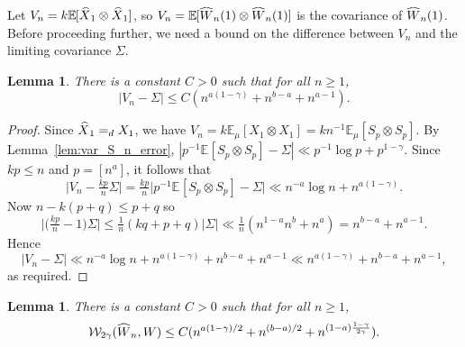 \documentclass[11pt,a4paper,reqno,oneside]{amsart}
\newcommand{\eqd}{=_d}
\newcommand{\Ex}[2][]{\mathbb{E}_{#1\!\!}\left[#2\right]}
\newcommand{\wass}{\mathcal{W}}
\newcommand{\shat}[1]{\vphantom{#1}\smash[t]{\widehat{#1}}}
\newtheorem{lemma}[theorem]{Lemma}
\theoremstyle{definition}
\theoremstyle{remark}
\numberwithin{equation}{section}
\begin{document}
	Let $ V_n = k\Ex{\shat X_1 \otimes \shat X_1} $, so $ V_n = \Ex{\shat W_n(1)\otimes \shat W_n(1)} $ is the covariance of $ \shat W_n(1) $. Before proceeding further, we need a bound on the difference between $ V_n $ and the limiting covariance $ \Sigma $.
	\begin{lemma}\label{lemma:indep_approx_covar_error}
		There is a constant $ C>0 $ such that for all $ n\ge 1 $, \[ |V_n - \Sigma|\le C(n^{a(1-\gamma)}+n^{b-a}+n^{a-1}). \]
	\end{lemma}
	\begin{proof}
		Since $\shat X_1\eqd X_1 $, we have
		$V_n = k\Ex[\mu]{ X_1 \otimes X_1}=kn^{-1}\Ex[\mu]{S_p\otimes S_p}.$ By Lemma~\ref{lem:var_S_n_error},
		$ |p^{-1}\Ex{S_p\otimes S_p} - \Sigma|\ll p^{-1}\log p+p^{1-\gamma}. $
		Since $ kp\le n $ and $ p=[n^a]$, it follows that
		\begin{equation*}
			\big|V_n - \tfrac{kp}{n}\Sigma\big|=\tfrac{kp}{n}\big|p^{-1}\Ex{S_p\otimes S_p} - \Sigma\big|\ll n^{-a}\log n+n^{a(1-\gamma)}.
		\end{equation*}
		Now $ n-k(p+q)\le p + q $ so 
		\[ \big|\big(\tfrac{kp}{n}-1\big)\Sigma\big|\le \tfrac{1}{n}(kq+p+q)|\Sigma|\ll \tfrac{1}{n}(n^{1-a}n^b+n^a)=n^{b-a}+n^{a-1}. \]
		Hence 
		\begin{equation*}
			|V_n - \Sigma| \ll n^{-a}\log n+n^{a(1-\gamma)}+n^{b-a}+n^{a-1}\ll n^{a(1-\gamma)}+n^{b-a}+n^{a-1},
		\end{equation*}
		as required.
	\end{proof}
	\begin{lemma}\label{lemma:approx_indep_big_blocks_bm}
		There is a constant $ C>0 $ such that for all $ n\ge 1 $,
		\[ \wass_{2\gamma}(\shat W_n,W) \le C(n^{a(1-\gamma)/2}+ n^{(b-a)/2}+n^{(1-a)\frac{1-\gamma}{2\gamma}}). \]
	\end{lemma}
\end{document}
